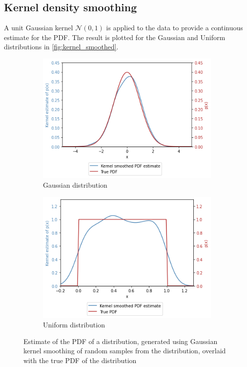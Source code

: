 \documentclass[a4paper]{article}
\begin{document}

\subsection{Kernel density smoothing}

A unit Gaussian kernel $\mathcal{N}(0, 1)$ is applied to the data to provide a continuous estimate for the PDF.
The result is plotted for the Gaussian and Uniform distributions in \autoref{fig:kernel_smoothed}.

\begin{figure}[h]
    \centering
    \begin{subfigure}[b]{0.45\textwidth}
        \centering
        \includegraphics[width=\textwidth]{figures/gaussian_kernel_smoothed.png}
        \caption{Gaussian distribution}
        \label{fig:gaussian_kernel_smoothed}
    \end{subfigure}
    \hfill
    \begin{subfigure}[b]{0.45\textwidth}
        \centering
        \includegraphics[width=\textwidth]{figures/uniform_kernel_smoothed.png}
        \caption{Uniform distribution}
        \label{fig:uniform_kernel_smoothed}
    \end{subfigure}
    \caption{Estimate of the PDF of a distribution, generated using Gaussian kernel smoothing of random samples from the
             distribution, overlaid with the true PDF of the distribution}
    \label{fig:kernel_smoothed}
\end{figure}
\end{document}
